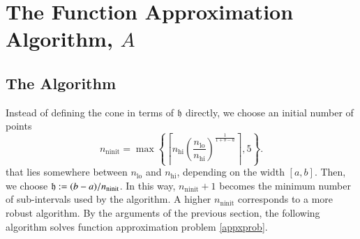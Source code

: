 \documentclass[review]{elsarticle}
\theoremstyle{definition}
\DeclareMathOperator{\lo}{lo}
\DeclareMathOperator{\ninit}{ninit}
\begin{document}
\section{The Function Approximation Algorithm, $A$}\label{sec:fappx}

\subsection{The Algorithm}
Instead of defining the cone in terms of $\mathfrak{h}$ directly, we choose an initial number of points
\begin{equation}
\label{nodefinition}
n_{\ninit} = \max\left\{\left\lceil n_{\text{hi}}
\left(\frac{n_{\lo}}{n_{\text{hi}}}\right)^{\frac{1}{1+b-a}}\right\rceil ,5\right\}.
\end{equation}
that lies somewhere between $n_{\lo}$ and $n_{\text{hi}}$, depending on the width $[a,b]$.  Then, we choose $\fh := (b-a)/n_{\ninit}$.  In this way, $n_{\ninit} + 1$ becomes the minimum number of sub-intervals used by the algorithm.  A higher $n_{\ninit}$ corresponds to a more robust algorithm.  By the arguments of the previous section, the following algorithm solves function approximation problem \eqref{appxprob}.
\end{document}
